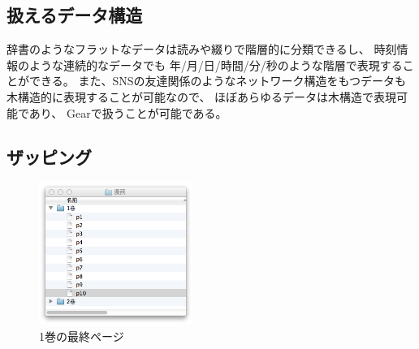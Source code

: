\documentclass[twoside]{wiss}
\def\GEAR{\textsf{Gear}}
\def\figwidth{50mm}
\begin{document}
\subsection{扱えるデータ構造}

辞書のようなフラットなデータは読みや綴りで階層的に分類できるし、
時刻情報のような連続的なデータでも
年/月/日/時間/分/秒のような階層で表現することができる。
また、SNSの友達関係のようなネットワーク構造をもつデータも
木構造的に表現することが可能なので、
ほぼあらゆるデータは木構造で表現可能であり、
{\GEAR}で扱うことが可能である。

% 
% 
% 

\subsection{ザッピング}


\begin{figure}[H]
\centerline{\includegraphics[width=\figwidth,bb=0 0 344 318]{figures/9a8615b0242c9ba4deb77ca30ab94d7c.png}}
\caption{1巻の最終ページ}
\label{manga1}
\end{figure}
\end{document}
